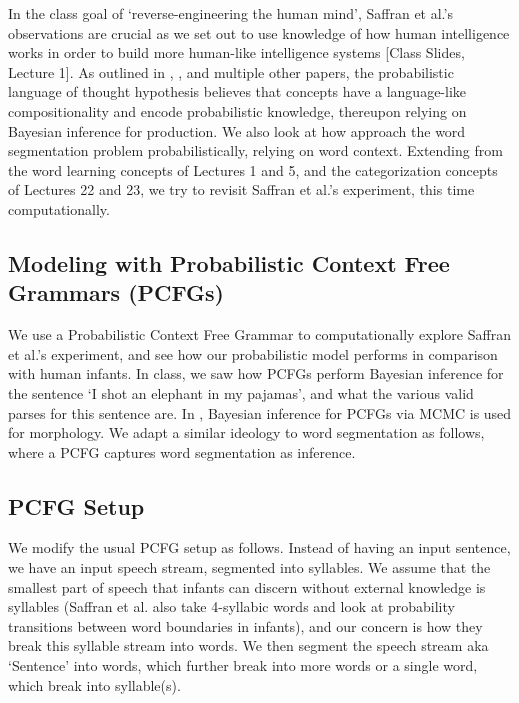 \documentclass{article}
\begin{document}
In the class goal of `reverse-engineering the human mind', Saffran et al.'s observations are crucial as we set out to use knowledge of how human intelligence works in order to build more human-like intelligence systems [Class Slides, Lecture 1]. As outlined in \citet{Goodman2014ConceptsIA}, \citet{Goodmand&Tenenbaum2016}, \citet{Tenenbaum2012} and multiple other papers, the probabilistic language of thought hypothesis believes that concepts have a language-like compositionality and encode probabilistic knowledge, thereupon relying on Bayesian inference for production. We also look at how \citet{GOLDWATER200921} approach the word segmentation problem probabilistically, relying on word context. Extending from the word learning concepts of Lectures 1 and 5, and the categorization concepts of Lectures 22 and 23, we try to revisit Saffran et al.'s experiment, this time computationally.
\subsection{Modeling with Probabilistic Context Free Grammars (PCFGs)}
We use a Probabilistic Context Free Grammar to computationally explore Saffran et al.'s experiment, and see how our probabilistic model performs in comparison with human infants. In class, we saw how PCFGs perform Bayesian inference for the sentence `I shot an elephant in my pajamas', and what the various valid parses for this sentence are. In \citet{Johnson2007BayesianIF}, Bayesian inference for PCFGs via MCMC is used for morphology. We adapt a similar ideology to word segmentation as follows, where a PCFG captures word segmentation as inference.

\subsection{PCFG Setup}
We modify the usual PCFG setup as follows. Instead of having an input sentence, we have an input speech stream, segmented into syllables. We assume that the smallest part of speech that infants can discern without external knowledge is syllables (Saffran et al. also take 4-syllabic words and look at probability transitions between word boundaries in infants), and our concern is how they break this syllable stream into words. We then segment the speech stream aka `Sentence' into words, which further break into more words or a single word, which break into syllable(s).
\end{document}
